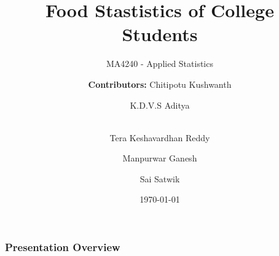 \documentclass{beamer}
\title{Food Stastistics of College Students}
\subtitle{MA4240 - Applied Statistics}
\author{\textbf{Contributors:} Chitipotu Kushwanth \and K.D.V.S Aditya \and \\ Tera Keshavardhan Reddy \and Manpurwar Ganesh \and Sai Satwik}
\date{\today}
\begin{document}







\begin{frame}
	\titlepage %
\end{frame}



\begin{frame}
    \frametitle{Presentation Overview }
    
    \tableofcontents %
\end{frame}





\end{document}
